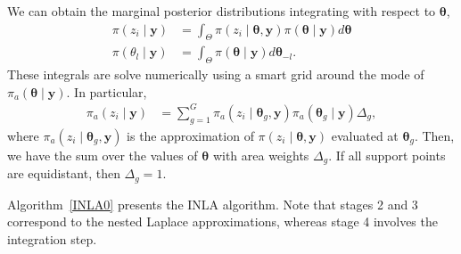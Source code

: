 We can obtain the marginal posterior distributions integrating with respect to $\boldsymbol{\theta}$,
\begin{align*}
	\pi(z_i\mid \boldsymbol{y})&=\int_{{\Theta}} \pi(z_i\mid \boldsymbol{\theta},\boldsymbol{y})\pi(\boldsymbol{\theta}\mid\boldsymbol{y})d\boldsymbol{\theta}\\
	\pi(\theta_l\mid\boldsymbol{y})&=\int_{{\Theta}} \pi(\boldsymbol{\theta}\mid \boldsymbol{y})d\boldsymbol{\theta}_{-l}.
\end{align*}
These integrals are solve numerically using a smart grid around the mode of $\pi_a(\boldsymbol{\theta}\mid\boldsymbol{y})$. In particular, 
\begin{align*}
	\pi_a(z_i\mid \boldsymbol{y})&=\sum_{g=1}^G \pi_{a}(z_i\mid \boldsymbol{\theta}_g,\boldsymbol{y})\pi_a(\boldsymbol{\theta}_g\mid \boldsymbol{y})\Delta_g,
\end{align*}
where $\pi_{a}(z_i\mid \boldsymbol{\theta}_g,\boldsymbol{y})$ is the approximation of $\pi(z_i\mid \boldsymbol{\theta},\boldsymbol{y})$ evaluated at $\boldsymbol{\theta}_g$. Then, we have the sum over the values of $\boldsymbol{\theta}$ with area weights $\Delta_g$. If all support points are equidistant, then $\Delta_g = 1$.

Algorithm~\ref{INLA0} presents the INLA algorithm. Note that stages 2 and 3 correspond to the nested Laplace approximations, whereas stage 4 involves the integration step.
    
